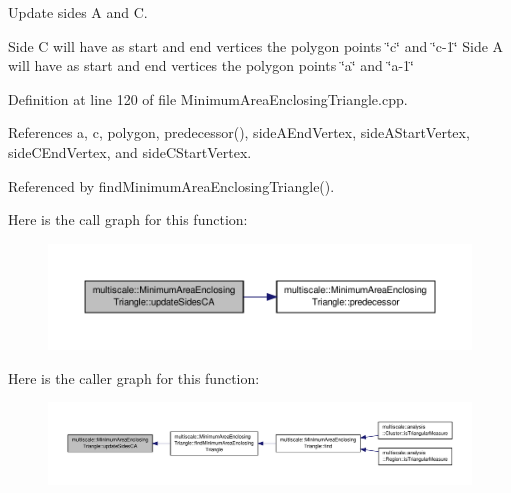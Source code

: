 Update sides A and C. 

Side C will have as start and end vertices the polygon points \char`\"{}c\char`\"{} and \char`\"{}c-\/1\char`\"{} Side A will have as start and end vertices the polygon points \char`\"{}a\char`\"{} and \char`\"{}a-\/1\char`\"{} 

Definition at line 120 of file Minimum\-Area\-Enclosing\-Triangle.\-cpp.



References a, c, polygon, predecessor(), side\-A\-End\-Vertex, side\-A\-Start\-Vertex, side\-C\-End\-Vertex, and side\-C\-Start\-Vertex.



Referenced by find\-Minimum\-Area\-Enclosing\-Triangle().



Here is the call graph for this function\-:\nopagebreak
\begin{figure}[H]
\begin{center}
\leavevmode
\includegraphics[width=350pt]{classmultiscale_1_1MinimumAreaEnclosingTriangle_a8c906ab782ec5feb1767869a61d3620d_cgraph}
\end{center}
\end{figure}




Here is the caller graph for this function\-:\nopagebreak
\begin{figure}[H]
\begin{center}
\leavevmode
\includegraphics[width=350pt]{classmultiscale_1_1MinimumAreaEnclosingTriangle_a8c906ab782ec5feb1767869a61d3620d_icgraph}
\end{center}
\end{figure}




